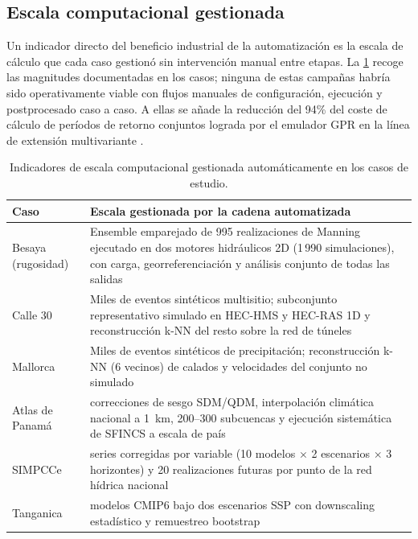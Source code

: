 \subsection{Escala computacional gestionada}

Un indicador directo del beneficio industrial de la automatización es la escala de cálculo que cada caso gestionó sin intervención manual entre etapas. La \cref{tab:escala_computacional} recoge las magnitudes documentadas en los casos; ninguna de estas campañas habría sido operativamente viable con flujos manuales de configuración, ejecución y postprocesado caso a caso. A ellas se añade la reducción del 94\% del coste de cálculo de períodos de retorno conjuntos lograda por el emulador GPR en la línea de extensión multivariante \parencite{urrea2026vine}.

\begin{table}[htbp]
  \centering
  \caption{Indicadores de escala computacional gestionada automáticamente en los casos de estudio.}
  \label{tab:escala_computacional}
  \small
  \begin{tabular}{>{\raggedright\arraybackslash}p{}>{\raggedright\arraybackslash}p{}}
    \toprule
    Caso & Escala gestionada por la cadena automatizada \\
    \midrule
    Besaya (rugosidad) & Ensemble emparejado de 995 realizaciones de Manning ejecutado en dos motores hidráulicos 2D (1\,990 simulaciones), con carga, georreferenciación y análisis conjunto de todas las salidas \\
    Calle 30 & Miles de eventos sintéticos multisitio; subconjunto representativo simulado en HEC-HMS y HEC-RAS 1D y reconstrucción k-NN del resto sobre la red de túneles \\
    Mallorca & Miles de eventos sintéticos de precipitación; reconstrucción k-NN (6 vecinos) de calados y velocidades del conjunto no simulado \\
    Atlas de Panamá & 414 correcciones de sesgo SDM/QDM, interpolación climática nacional a 1~km, 200--300 subcuencas y ejecución sistemática de SFINCS a escala de país \\
    SIMPCCe & 60 series corregidas por variable (10 modelos $\times$ 2 escenarios $\times$ 3 horizontes) y 20 realizaciones futuras por punto de la red hídrica nacional \\
    Tanganica & 19 modelos CMIP6 bajo dos escenarios SSP con downscaling estadístico y remuestreo bootstrap \\
    \bottomrule
  \end{tabular}
\end{table}

